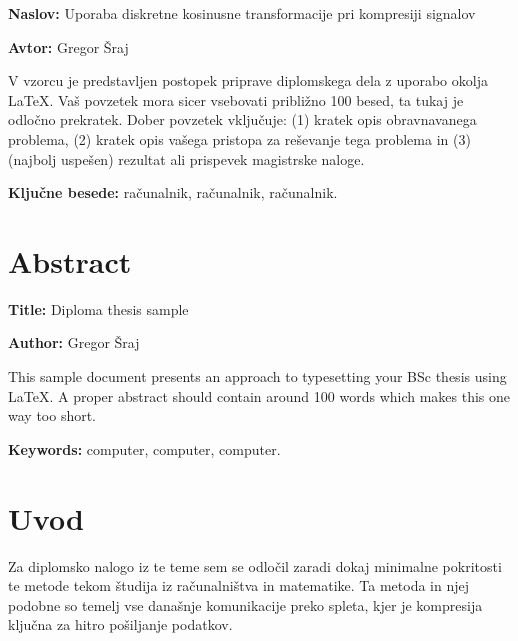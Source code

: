 \documentclass[a4paper, 12pt]{book}
\newcommand{\ttitle}{Uporaba diskretne kosinusne transformacije pri kompresiji signalov}
\newcommand{\ttitleEn}{Diploma thesis sample}
\newcommand{\tauthor}{Gregor Šraj}
\newcommand{\tkeywords}{računalnik, računalnik, računalnik}
\newcommand{\tkeywordsEn}{computer, computer, computer}
\newcommand{\clearemptydoublepage}{\newpage{\pagestyle{empty}\cleardoublepage}}
\begin{document}
\noindent\textbf{Naslov:} \ttitle
\bigskip

\noindent\textbf{Avtor:} \tauthor
\bigskip

\noindent V vzorcu je predstavljen postopek priprave diplomskega dela z uporabo okolja \LaTeX. Vaš povzetek mora sicer vsebovati približno 100 besed, ta tukaj je odločno prekratek.
Dober povzetek vključuje: (1) kratek opis obravnavanega problema, (2) kratek opis vašega pristopa za reševanje tega problema in (3) (najbolj uspešen) rezultat ali prispevek magistrske naloge.

\bigskip

\noindent\textbf{Ključne besede:} \tkeywords.
\clearemptydoublepage

\chapter*{Abstract}

\noindent\textbf{Title:} \ttitleEn
\bigskip

\noindent\textbf{Author:} \tauthor
\bigskip

\noindent This sample document presents an approach to typesetting your BSc thesis using \LaTeX. 
A proper abstract should contain around 100 words which makes this one way too short.
\bigskip

\noindent\textbf{Keywords:} \tkeywordsEn.
\clearemptydoublepage

\mainmatter
\setcounter{page}{1}
\pagestyle{fancy}

\chapter{Uvod}
Za diplomsko nalogo iz te teme sem se odločil zaradi dokaj minimalne pokritosti te metode tekom študija iz računalništva in matematike. Ta metoda in njej podobne so temelj vse današnje komunikacije preko spleta, kjer je kompresija ključna za hitro pošiljanje podatkov. \par
\end{document}
